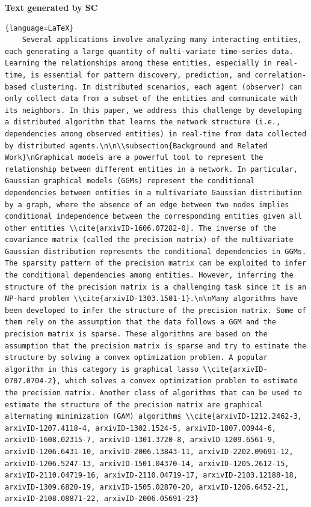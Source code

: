 \textbf{Text generated by SC}
\begin{lstlisting}{language=LaTeX}
    Several applications involve analyzing many interacting entities, each generating a large quantity of multi-variate time-series data. Learning the relationships among these entities, especially in real-time, is essential for pattern discovery, prediction, and correlation-based clustering. In distributed scenarios, each agent (observer) can only collect data from a subset of the entities and communicate with  its neighbors. In this paper, we address this challenge by developing a distributed algorithm that learns the network structure (i.e., dependencies among observed entities) in real-time from data collected by distributed agents.\n\n\\subsection{Background and Related Work}\nGraphical models are a powerful tool to represent the relationship between different entities in a network. In particular, Gaussian graphical models (GGMs) represent the conditional dependencies between entities in a multivariate Gaussian distribution by a graph, where the absence of an edge between two nodes implies conditional independence between the corresponding entities given all other entities \\cite{arxivID-1606.07282-0}. The inverse of the covariance matrix (called the precision matrix) of the multivariate Gaussian distribution represents the conditional dependencies in GGMs. The sparsity pattern of the precision matrix can be exploited to infer the conditional dependencies among entities. However, inferring the structure of the precision matrix is a challenging task since it is an NP-hard problem \\cite{arxivID-1303.1501-1}.\n\nMany algorithms have been developed to infer the structure of the precision matrix. Some of them rely on the assumption that the data follows a GGM and the precision matrix is sparse. These algorithms are based on the assumption that the precision matrix is sparse and try to estimate the structure by solving a convex optimization problem. A popular algorithm in this category is graphical lasso \\cite{arxivID-0707.0704-2}, which solves a convex optimization problem to estimate the precision matrix. Another class of algorithms that can be used to estimate the structure of the precision matrix are graphical alternating minimization (GAM) algorithms \\cite{arxivID-1212.2462-3, arxivID-1207.4118-4, arxivID-1302.1524-5, arxivID-1807.00944-6, arxivID-1608.02315-7, arxivID-1301.3720-8, arxivID-1209.6561-9, arxivID-1206.6431-10, arxivID-2006.13843-11, arxivID-2202.09691-12, arxivID-1206.5247-13, arxivID-1501.04370-14, arxivID-1205.2612-15, arxivID-2110.04719-16, arxivID-2110.04719-17, arxivID-2103.12188-18, arxivID-1309.6820-19, arxivID-1505.02870-20, arxivID-1206.6452-21, arxivID-2108.08871-22, arxivID-2006.05691-23}
\end{lstlisting}

